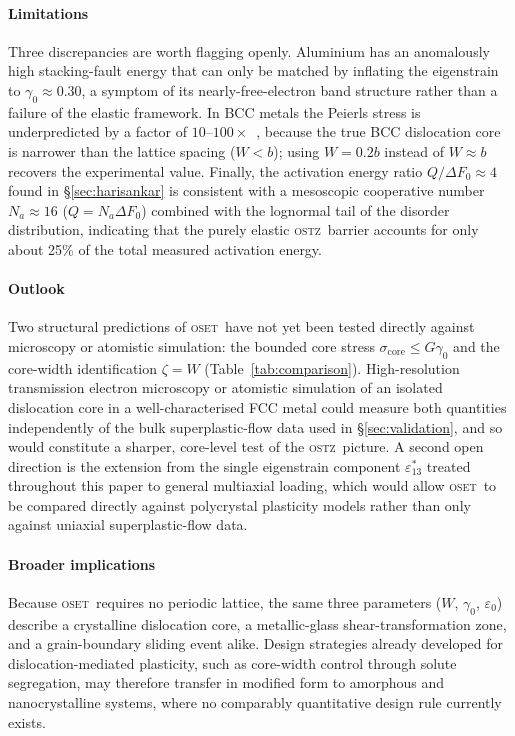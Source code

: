 \documentclass[3p]{elsarticle}
\newcommand{\OSTZ}{\textsc{ostz}}
\newcommand{\OSET}{\textsc{oset}}
\newcommand{\dF}{\Delta F_0}
\newcommand{\gz}{\gamma_0}
\begin{document}
\paragraph{Limitations}
Three discrepancies are worth flagging openly. Aluminium has an
anomalously high stacking-fault energy that can only be matched by
inflating the eigenstrain to $\gz\approx0.30$, a symptom of its
nearly-free-electron band structure rather than a failure of the
elastic framework. In BCC metals the Peierls stress is
underpredicted by a factor of $10$--$100\times$~\citep{nabarro1997},
because the true BCC dislocation core is narrower than the lattice
spacing ($W<b$); using $W=0.2b$ instead of $W\approx b$ recovers the
experimental value. Finally, the activation energy ratio
$Q/\dF\approx4$ found in \S\ref{sec:harisankar} is consistent with a
mesoscopic cooperative number $N_a\approx16$ ($Q=N_a\dF$) combined
with the lognormal tail of the disorder distribution, indicating
that the purely elastic \OSTZ\ barrier accounts for only about 25\%
of the total measured activation energy.

\paragraph{Outlook}
Two structural predictions of \OSET\ have not yet been tested
directly against microscopy or atomistic simulation: the bounded
core stress $\sigma_\text{core}\le G\gz$ and the core-width
identification $\zeta=W$ (Table~\ref{tab:comparison}). High-resolution
transmission electron microscopy or atomistic simulation of an
isolated dislocation core in a well-characterised FCC metal could
measure both quantities independently of the bulk superplastic-flow
data used in \S\ref{sec:validation}, and so would constitute a
sharper, core-level test of the \OSTZ\ picture. A second open
direction is the extension from the single eigenstrain component
$\varepsilon^*_{13}$ treated throughout this paper to general
multiaxial loading, which would allow \OSET\ to be compared directly
against polycrystal plasticity models rather than only against
uniaxial superplastic-flow data.

\paragraph{Broader implications}
Because \OSET\ requires no periodic lattice, the same three
parameters ($W$, $\gz$, $\varepsilon_0$) describe a crystalline
dislocation core, a metallic-glass shear-transformation zone, and a
grain-boundary sliding event alike. Design strategies already
developed for dislocation-mediated plasticity, such as core-width
control through solute segregation, may therefore transfer in
modified form to amorphous and nanocrystalline systems, where no
comparably quantitative design rule currently exists.
\end{document}
